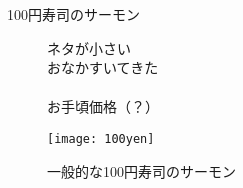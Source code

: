 \begin{frame}[fragile,c]{100円寿司のサーモン}
    \centering

    \begin{figure}[H]
        \begin{minipage}{0.55\hsize}
            \centering
            ネタが小さい\\
            おなかすいてきた\\
            　\\
            お手頃価格（？）\\
        \end{minipage}
        \begin{minipage}{0.4\hsize}
            \centering
            \texttt{[image: 100yen]}
            \caption{一般的な100円寿司のサーモン}
            \label{fig:100yen}
        \end{minipage}
    \end{figure}

\end{frame}

